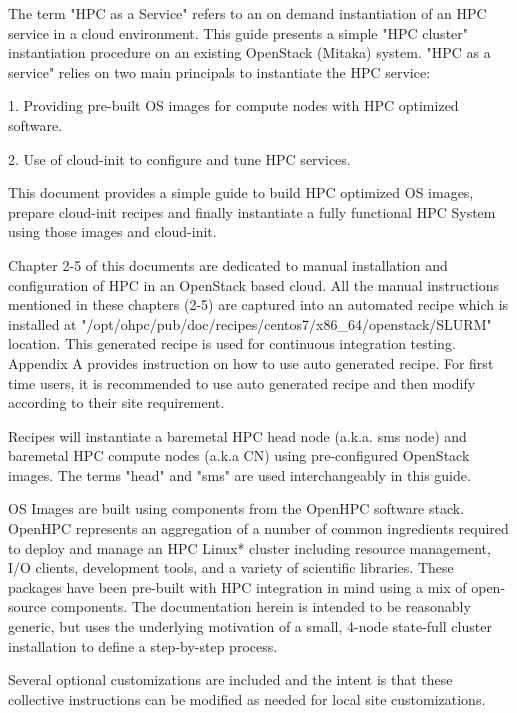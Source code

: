 The term "HPC as a Service" refers to an on demand instantiation of an HPC service in a cloud environment. This guide presents a simple "HPC cluster" instantiation procedure on an existing OpenStack (Mitaka) system. "HPC as a service" relies on two main principals to instantiate the HPC service:


\begin{list}{}
	\item 	1. Providing pre-built OS images for compute nodes with HPC optimized software.
	\item   2. Use of cloud-init to configure and tune HPC services.
	\item   
	 
\end{list}
	
This document provides a simple guide to build HPC optimized OS images, prepare cloud-init recipes and finally instantiate a fully functional HPC System using those images and cloud-init. 

Chapter 2-5 of this documents are dedicated to manual installation and configuration of HPC in an OpenStack based cloud. All the manual instructions mentioned in these chapters (2-5) are captured into an automated recipe which is installed at "/opt/ohpc/pub/doc/recipes/centos7/x86\_64/openstack/SLURM" location. This generated recipe is used for continuous integration testing. 
Appendix A provides instruction on how to use auto generated recipe. For first time users, it is recommended to use auto generated recipe and then modify according to their site requirement.

Recipes will instantiate a baremetal HPC head node (a.k.a. sms node) and baremetal HPC compute nodes (a.k.a CN) using pre-configured OpenStack images. The terms "head" and "sms" are used interchangeably in this guide.

OS Images are built using components from the OpenHPC software stack. OpenHPC represents an aggregation of a number of common ingredients required to deploy and manage an HPC Linux* cluster including resource management, I/O clients, development tools, and a variety of scientific libraries. These packages have been pre-built with HPC integration in mind using a mix of open-source components. The documentation herein is intended to be reasonably generic,
but uses the underlying motivation of a small, 4-node state-full cluster installation to define a step-by-step process. 

Several optional customizations are included and the intent is that these collective instructions can be modified as needed for local site customizations.


